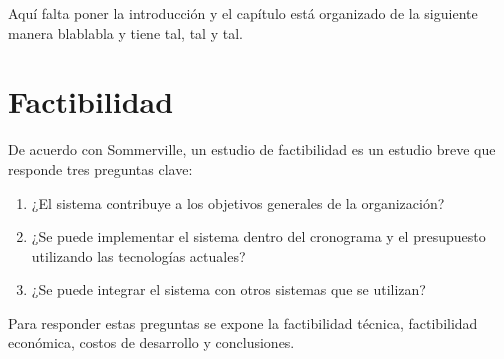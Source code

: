 





Aquí falta poner la introducción y el capítulo está organizado de la siguiente manera blablabla y tiene tal, tal y tal.


\section{Factibilidad}

De acuerdo con Sommerville\cite{sommerville_software_2011}, un estudio de factibilidad es un estudio breve que responde tres preguntas clave:

\begin{enumerate}
    \item ¿El sistema contribuye a los objetivos generales de la organización? 
    \item ¿Se puede implementar el sistema dentro del cronograma y el presupuesto utilizando las tecnologías actuales? 
    \item ¿Se puede integrar el sistema con otros sistemas que se utilizan? 
\end{enumerate}


Para responder estas preguntas se expone la factibilidad técnica, factibilidad económica, costos de desarrollo y conclusiones.







